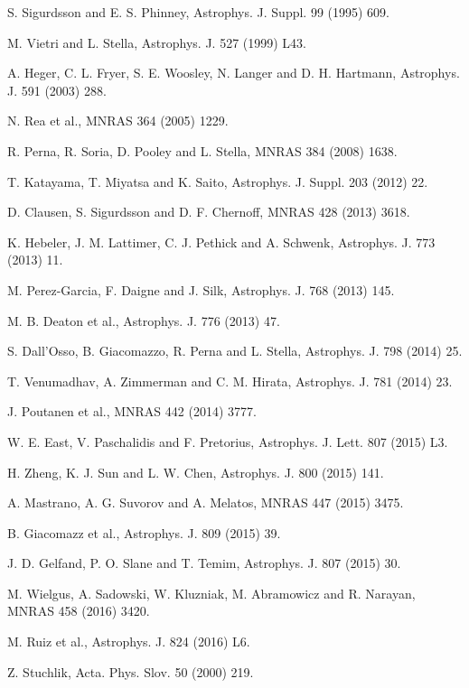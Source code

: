 \documentclass[aps]{revtex4}
\begin{document}
\begin{thebibliography}{999}
 S. Sigurdsson and E. S. Phinney, Astrophys. J. Suppl.
99 (1995) 609.

 M. Vietri and L. Stella, Astrophys. J. 527 (1999) L43.

 A. Heger, C. L. Fryer, S. E. Woosley, N. Langer and D. H.
Hartmann, Astrophys. J. 591 (2003) 288.

 N. Rea et al., MNRAS 364 (2005) 1229.

 R. Perna, R. Soria, D. Pooley and L. Stella, MNRAS 384
(2008) 1638.

 T. Katayama, T. Miyatsa and K. Saito, Astrophys. J.
Suppl. 203 (2012) 22.

 D. Clausen, S. Sigurdsson and D. F. Chernoff, MNRAS 428
(2013) 3618.

 K. Hebeler, J. M. Lattimer, C. J. Pethick and A. Schwenk,
Astrophys. J. 773 (2013) 11.

 M. Perez-Garcia, F. Daigne and J. Silk, Astrophys. J. 768
(2013) 145.

 M. B. Deaton et al., Astrophys. J. 776 (2013) 47.

 S. Dall'Osso, B. Giacomazzo, R. Perna and L. Stella,
Astrophys. J. 798 (2014) 25.

 T. Venumadhav, A. Zimmerman and C. M. Hirata,
Astrophys. J. 781 (2014) 23.

 J. Poutanen et al., MNRAS 442 (2014) 3777.

 W. E. East, V. Paschalidis and F. Pretorius, Astrophys. J.
Lett. 807 (2015) L3.

 H. Zheng, K. J. Sun and L. W. Chen, Astrophys. J. 800 (2015)
141.

 A. Mastrano, A. G. Suvorov and A. Melatos, MNRAS 447
(2015) 3475.

 B. Giacomazz et al., Astrophys. J. 809 (2015) 39.

 J. D. Gelfand, P. O. Slane and T. Temim, Astrophys. J. 807
(2015) 30.

 M. Wielgus, A. Sadowski, W. Kluzniak, M. Abramowicz and R.
Narayan, MNRAS 458 (2016) 3420.

 M. Ruiz et al., Astrophys. J. 824 (2016) L6.

 Z. Stuchlik, Acta. Phys. Slov. 50 (2000) 219.


\end{thebibliography}
\end{document}
